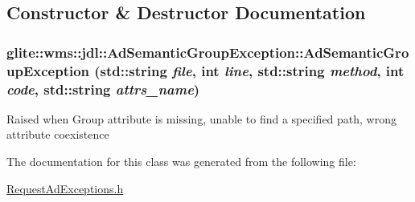 \subsection{Constructor \& Destructor Documentation}
\hypertarget{classglite_1_1wms_1_1jdl_1_1AdSemanticGroupException_a0}{
\subsubsection[AdSemanticGroupException]{\setlength{\rightskip}{0pt plus 5cm}glite::wms::jdl::Ad\-Semantic\-Group\-Exception::Ad\-Semantic\-Group\-Exception (std::string {\em file}, int {\em line}, std::string {\em method}, int {\em code}, std::string {\em attrs\_\-name})}}
\label{classglite_1_1wms_1_1jdl_1_1AdSemanticGroupException_a0}


Raised when Group attribute is missing, unable to find a specified path, wrong attribute coexistence 

The documentation for this class was generated from the following file:\begin{CompactItemize}
\item 
\hyperlink{RequestAdExceptions_8h}{Request\-Ad\-Exceptions.h}\end{CompactItemize}
